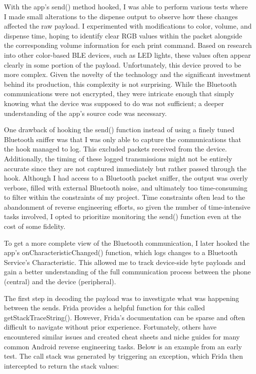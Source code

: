 With the app’s send() method hooked, I was able to perform various tests where I made small alterations to the dispense output to observe how these changes affected the raw payload. I experimented with modifications to color, volume, and dispense time, hoping to identify clear RGB values within the packet alongside the corresponding volume information for each print command. Based on research into other color-based BLE devices, such as LED lights, these values often appear clearly in some portion of the payload.
Unfortunately, this device proved to be more complex. Given the novelty of the technology and the significant investment behind its production, this complexity is not surprising. While the Bluetooth communications were not encrypted, they were intricate enough that simply knowing what the device was supposed to do was not sufficient; a deeper understanding of the app’s source code was necessary.

One drawback of hooking the send() function instead of using a finely tuned Bluetooth sniffer was that I was only able to capture the communications that the hook managed to log. This excluded packets received from the device. Additionally, the timing of these logged transmissions might not be entirely accurate since they are not captured immediately but rather passed through the hook. Although I had access to a Bluetooth packet sniffer, the output was overly verbose, filled with external Bluetooth noise, and ultimately too time-consuming to filter within the constraints of my project. Time constraints often lead to the abandonment of reverse engineering efforts, so given the number of time-intensive tasks involved, I opted to prioritize monitoring the send() function even at the cost of some fidelity.

To get a more complete view of the Bluetooth communication, I later hooked the app’s onCharacteristicChanged() function, which logs changes to a Bluetooth Service's Characteristic. This allowed me to track device-side byte payloads and gain a better understanding of the full communication process between the phone (central) and the device (peripheral).

The first step in decoding the payload was to investigate what was happening between the sends. Frida provides a helpful function for this called getStackTraceString(). However, Frida’s documentation can be sparse and often difficult to navigate without prior experience. Fortunately, others have encountered similar issues and created cheat sheets and niche guides for many common Android reverse engineering tasks. Below is an example from an early test. The call stack was generated by triggering an exception, which Frida then intercepted to return the stack values:

